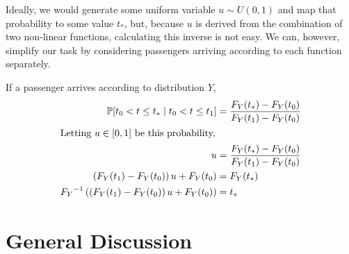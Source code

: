 \documentclass[12pt]{article}
\newcommand{\Prob}{\mathbb P}
\begin{document}
Ideally, we would generate some uniform variable $u \sim U(0, 1)$ and map that
probability to some value $t_*$, but, because $u$ is derived from the
combination of two non-linear functions, calculating this inverse is not easy.
We can, however, simplify our task by considering passengers arriving
according to each function separately.

If a passenger arrives according to distribution $Y$,
\begin{align*}
    \Prob[t_0 < t \le t_* \mid t_0 < t \le t_1]
    &= \frac{F_Y(t_*) - F_Y(t_0)}{F_Y(t_1) - F_Y(t_0)}\\
    \shortintertext{Letting $u \in [0, 1]$ be this probability,}
    u
    &= \frac{F_Y(t_*) - F_Y(t_0)}{F_Y(t_1) - F_Y(t_0)}\\
    \left(F_Y(t_1) - F_Y(t_0)\right)u + F_Y(t_0)
    &= F_Y(t_*)\\
    {F_Y}^{-1}\left(\left(F_Y(t_1) - F_Y(t_0)\right)u + F_Y(t_0)\right)
    &= t_*
\end{align*}



\section{General Discussion}
\end{document}
